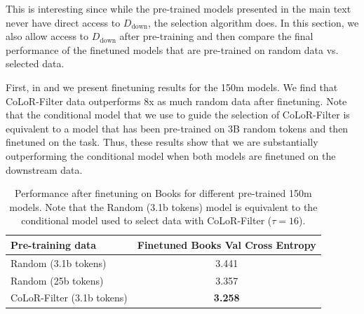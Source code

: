 \documentclass{article}
\newcommand{\Ddown}{D_{\text{down}}}
\begin{document}
This is interesting since while the pre-trained models presented in the main text never have direct access to $ \Ddown$, the selection algorithm does. In this section, we also allow access to $ \Ddown$ after pre-training and then compare the final performance of the finetuned models that are pre-trained on random data vs. selected data.

First, in  and  we present finetuning results for the 150m models. We find that CoLoR-Filter data outperforms 8x as much random data after finetuning. Note that the conditional model that we use to guide the selection of CoLoR-Filter is equivalent to a model that has been pre-trained on 3B random tokens and then finetuned on the task. Thus, these results show that we are substantially outperforming the conditional model when both models are finetuned on the downstream data.

\begin{table}[h]
    \caption{Performance after finetuning on Books for different pre-trained 150m models. Note that the Random (3.1b tokens) model is equivalent to the conditional model used to select data with CoLoR-Filter ($\tau=16$).}
    \label{tab:150m-books-fine}
    \centering
    \begin{tabular}{l|c}
    \toprule
Pre-training data & Finetuned Books Val Cross Entropy \\ \midrule
Random (3.1b tokens) & 3.441\\
Random (25b tokens) & 3.357\\
CoLoR-Filter (3.1b tokens)  & \textbf{3.258}\\
\bottomrule
    \end{tabular}
\end{table}


\begin{table}[h]
    \caption{Held out performance after finetuning on downstream data for different pre-trained 150m models. Note that the Random (3.1b tokens) model is equivalent to the conditional model used to select data with CoLoR-Filter ($\tau=16$).}
    \label{tab:150m-down-fine}
    \centering
\end{table}
\end{document}
